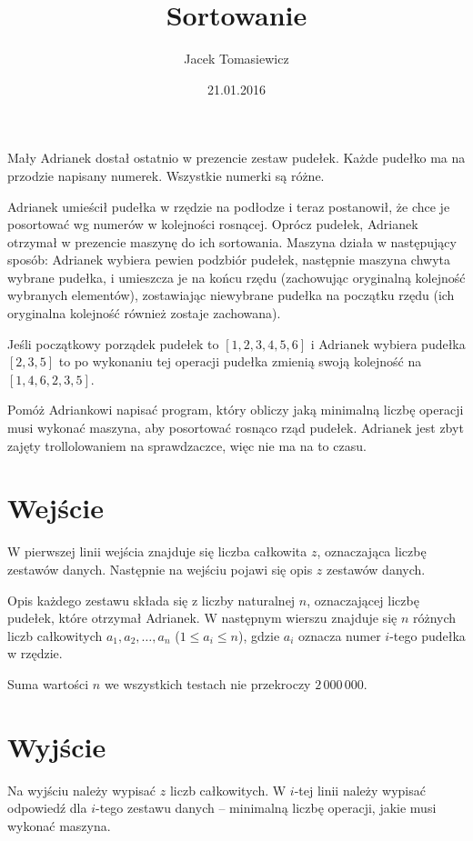 \documentclass[zad,zawodnik,utf8]{sinol}
\title{Sortowanie}
\author{Jacek Tomasiewicz} %
\date{21.01.2016}
\begin{document}
  \begin{tasktext}%
Mały Adrianek dostał ostatnio w prezencie zestaw pudełek. Każde pudełko ma na przodzie napisany numerek. Wszystkie numerki są różne. 

Adrianek umieścił pudełka w rzędzie na podłodze i teraz postanowił, że chce je posortować wg numerów w kolejności rosnącej. Oprócz pudełek, Adrianek otrzymał w prezencie maszynę do ich sortowania. Maszyna działa w następujący sposób: Adrianek wybiera pewien podzbiór pudełek, następnie maszyna chwyta wybrane pudełka, i umieszcza je na końcu rzędu (zachowując oryginalną kolejność wybranych elementów), zostawiając niewybrane pudełka na początku rzędu (ich oryginalna kolejność również zostaje zachowana).

Jeśli początkowy porządek pudełek to $[1,2,3,4,5,6]$ i Adrianek wybiera pudełka $[2,3,5]$ to po wykonaniu tej operacji pudełka zmienią swoją kolejność na $[1,4,6,2,3,5]$.

Pomóż Adriankowi napisać program, który obliczy jaką minimalną liczbę operacji musi wykonać maszyna, aby posortować rosnąco rząd pudełek. Adrianek jest zbyt zajęty trollolowaniem na sprawdzaczce, więc nie ma na to czasu.

  \section{Wejście}
W pierwszej linii wejścia znajduje się liczba całkowita $z$, oznaczająca liczbę zestawów danych. Następnie na wejściu pojawi się opis $z$ zestawów danych. 

Opis każdego zestawu składa się z liczby naturalnej $n$, oznaczającej liczbę pudełek, które otrzymał Adrianek. W następnym wierszu znajduje się $n$ różnych liczb całkowitych $a_1, a_2, \ldots, a_n$ ($1 \leq a_i \leq n$), gdzie $a_i$ oznacza numer $i$-tego pudełka w rzędzie. 

Suma wartości $n$ we wszystkich testach nie przekroczy $2 \,000\,000$.

  \section{Wyjście}
Na wyjściu należy wypisać $z$ liczb całkowitych. W $i$-tej linii należy wypisać odpowiedź dla $i$-tego zestawu danych -- minimalną liczbę operacji, jakie musi wykonać maszyna.


     \makecompactexample

  \end{tasktext}
\end{document}
